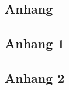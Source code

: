 \lstset{language=C}

\begin{appendices}
\chapter{Anhang}

\section{Anhang 1}
\label{sec:anhang1}

\newpage

\section{Anhang 2}
\label{anhang:anhang2}

\end{appendices}
